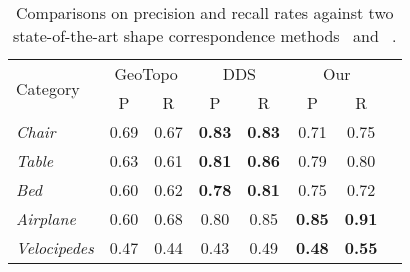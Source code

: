 \documentclass[acmtog]{acmart}
\newcommand{\new}[1]{{\color{black}#1}}
\begin{document}
\begin{table}[!ht]
\caption{
\new{Comparisons on precision and recall rates against two state-of-the-art shape correspondence methods~\citep{Alhashim_2015} and ~\citep{Zhu_2017}.
}}
\centering
  \begin{tabular}{lccccccc}
    \hline
    \multirow{2}{*}{Category} & \multicolumn{2}{c}{GeoTopo} &  \multicolumn{2}{c}{DDS} & \multicolumn{2}{c}{Our} \\\cline{2-7}
    & {P} & {R} & {P} & {R} & {P} & {R} \\
    \hline
    \textsl{Chair}  & 0.69  & 0.67 & \textbf{0.83} & \textbf{0.83} & 0.71 & 0.75   \\
    \textsl{Table}  & 0.63 & 0.61 & \textbf{0.81} & \textbf{0.86} & 0.79 & 0.80\\
    \textsl{Bed}   & 0.60 & 0.62 & \textbf{0.78} & \textbf{0.81} & 0.75 &0.72\\
    \textsl{Airplane} & 0.60 &0.68 & 0.80 & 0.85 & \textbf{0.85} & \textbf{0.91} \\
    \textsl{Velocipedes}    & 0.47 & 0.44 & 0.43 & 0.49 & \textbf{0.48} & \textbf{0.55} \\
    \hline
  \end{tabular}
\label{tab:ShapeCor}
\end{table}



 
\end{document}
